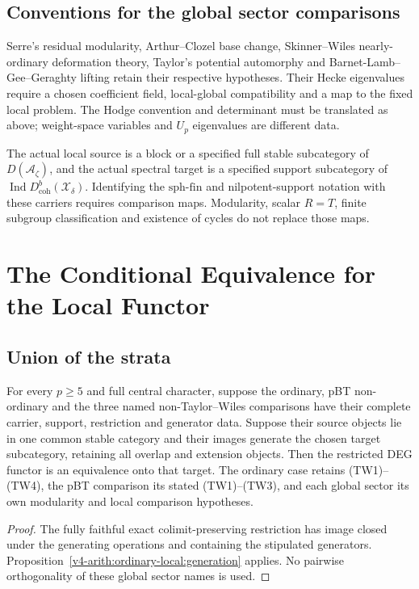 \subsection{Conventions for the global sector comparisons}
Serre's residual modularity, Arthur--Clozel base change,
Skinner--Wiles nearly-ordinary deformation theory, Taylor's potential
automorphy and Barnet-Lamb--Gee--Geraghty lifting retain their respective
hypotheses. Their Hecke eigenvalues require a chosen coefficient field,
local-global compatibility and a map to the fixed local problem.
The Hodge convention and determinant must be translated as above;
weight-space variables and $U_p$ eigenvalues are different data.

The actual local source is a block or a specified full stable
subcategory of $D(\mathcal A_\zeta)$, and the actual spectral target
is a specified support subcategory of
$\operatorname{Ind}D^b_{\mathrm{coh}}(\mathcal X_\delta)$.
Identifying the $\mathrm{sph\text{-}fin}$ and nilpotent-support
notation with these carriers requires comparison maps. Modularity,
scalar $R=T$, finite subgroup classification and existence of cycles
do not replace those maps.

\section{The Conditional Equivalence for the Local Functor}
\label{v4-arith:w6-e:assembly}
\subsection{Union of the strata}
\begin{theorem}
\label{v4-arith:w6-e:thm:f1a1-maximal-uncond}
For every $p\ge5$ and full central character, suppose the ordinary,
pBT non-ordinary and the three named non-Taylor--Wiles comparisons
have their complete carrier, support, restriction and generator data.
Suppose their source objects lie in one common stable category and
their images generate the chosen target subcategory, retaining all
overlap and extension objects. Then the restricted DEG functor is an
equivalence onto that target. The ordinary case retains (TW1)--(TW4),
the pBT comparison its stated (TW1)--(TW3), and each global sector
its own modularity and local comparison hypotheses.
\end{theorem}
\begin{proof}
The fully faithful exact colimit-preserving restriction has image
closed under the generating operations and containing the stipulated
generators. Proposition~\ref{v4-arith:ordinary-local:generation}
applies. No pairwise orthogonality of these global sector names is used.
\end{proof}

